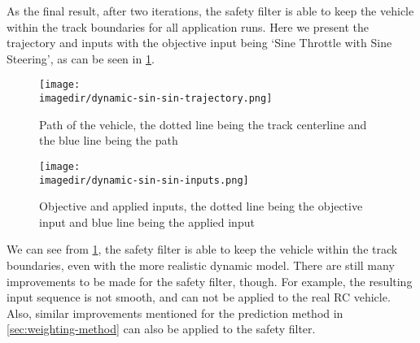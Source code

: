 As the final result, after two iterations, the safety filter is able to keep the vehicle within the track boundaries for all application runs.
Here we present the trajectory and inputs with the objective input being `Sine Throttle with Sine Steering', as can be seen in \cref{fig:dynamic-single-run}.


\begin{figure}[ht]
    \centering
    \texttt{[image: \\imagedir/dynamic-sin-sin-trajectory.png]}
    \caption{Path of the vehicle, the dotted line being the track centerline and the blue line being the path}
    \texttt{[image: \\imagedir/dynamic-sin-sin-inputs.png]}
    \caption{Objective and applied inputs, the dotted line being the objective input and blue line being the applied input}
    \label{fig:dynamic-single-run}
\end{figure}

We can see from \cref{fig:dynamic-single-run}, the safety filter is able to keep the vehicle within the track boundaries, even with the more realistic dynamic model.
There are still many improvements to be made for the safety filter, though.
For example, the resulting input sequence is not smooth, and can not be applied to the real RC vehicle.
Also, similar improvements mentioned for the prediction method in \cref{sec:weighting-method} can also be applied to the safety filter.
